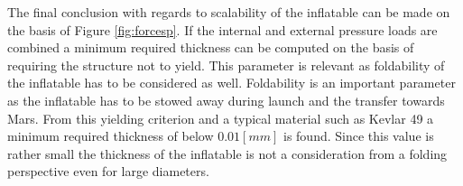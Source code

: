 The final conclusion with regards to scalability of the inflatable can be made on the basis of Figure \ref{fig:forcesp}. If the internal and external pressure loads are combined a minimum required thickness can be computed on the basis of requiring the structure not to yield. This parameter is relevant as foldability of the inflatable has to be considered as well. Foldability is an important parameter as the inflatable has to be stowed away during launch and the transfer towards Mars. From this yielding criterion and a typical material such as Kevlar 49 a minimum required thickness of below $0.01 \left[mm\right]$ is found. Since this value is rather small the thickness of the inflatable is not a consideration from a folding perspective even for large diameters.
